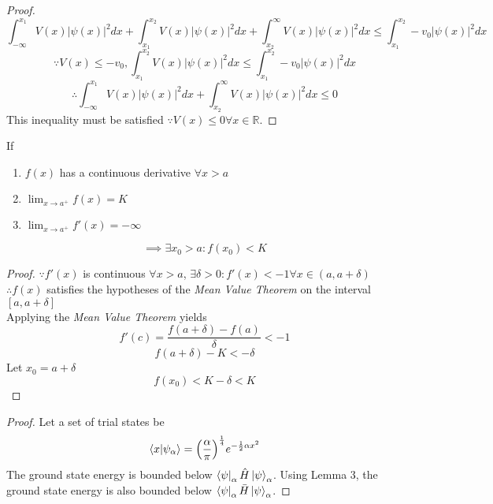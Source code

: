 \begin{sol}
\begin{proof}
\begin{equation}
	\int_{-\infty}^{x_1} V(x)|\psi(x)|^2dx+\int_{x_1}^{x_2} V(x)|\psi(x)|^2dx+\int_{x_2}^\infty V(x)|\psi(x)|^2dx\leq \int_{x_1}^{x_2} -v_0|\psi(x)|^2dx
\end{equation} \begin{equation}
	\because V(x)\leq -v_0, \int_{x_1}^{x_2} V(x)|\psi(x)|^2dx\leq \int_{x_1}^{x_2} -v_0|\psi(x)|^2dx
\end{equation}
\begin{equation}
	\therefore\int_{-\infty}^{x_1} V(x)|\psi(x)|^2dx+\int_{x_2}^\infty V(x)|\psi(x)|^2dx\leq 0
\end{equation}
This inequality must be satisfied $\because V(x)\leq 0\forall x\in\mathbb{R}$. 
\end{proof}
\begin{lemma}
If 
\begin{enumerate}
\item $f(x)$ has a continuous derivative  $\forall x>a$
\item $\lim_{x\to a^+}f(x)=K$
\item $\lim_{x\to a^+}f'(x)=-\infty$
\end{enumerate}
\begin{equation}
	\implies\exists x_0>a:f(x_0)<K
\end{equation}
\end{lemma}
\begin{proof}
$\because f'(x)$ is continuous $\forall x>a$, $\exists\delta>0:f'(x)<-1\forall x\in(a,a+\delta)$\\
$\therefore f(x)$ satisfies the hypotheses of the \textit{Mean Value Theorem} on the interval $[a,a+\delta]$\\
Applying the \textit{Mean Value Theorem} yields
\begin{equation}
	f'(c)=\frac{f(a+\delta)-f(a)}{\delta}<-1
\end{equation} \begin{equation}
	f(a+\delta)-K<-\delta
\end{equation} Let $x_0=a+\delta$ 
\begin{equation}
	f(x_0)<K-\delta<K
\end{equation}
\end{proof}
\begin{proof}
Let a set of trial states be
\begin{equation}
	\braket{x}{\psi_\alpha}=\Big(\frac{\alpha}{\pi}\Big)^\frac{1}{4}e^{-\frac{1}{2}\alpha x^2}
\end{equation}
The ground state energy is bounded below $\bra\psi_\alpha\hat H\ket\psi_\alpha$. Using Lemma 3, the ground state energy is also bounded below $\bra\psi_\alpha\bar H\ket\psi_\alpha$.

\end{proof}
\end{sol}
